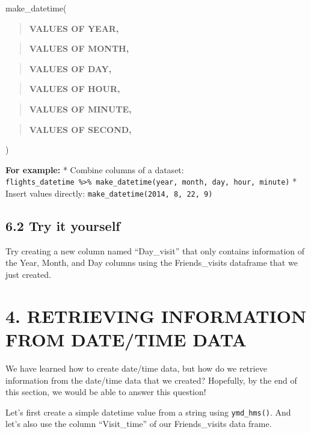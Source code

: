 \documentclass[
]{book}
\begin{document}
make\_datetime(

\begin{quote}
\textbf{VALUES OF YEAR,}
\end{quote}

\begin{quote}
\textbf{VALUES OF MONTH,}
\end{quote}

\begin{quote}
\textbf{VALUES OF DAY,}
\end{quote}

\begin{quote}
\textbf{VALUES OF HOUR,}
\end{quote}

\begin{quote}
\textbf{VALUES OF MINUTE,}
\end{quote}

\begin{quote}
\textbf{VALUES OF SECOND,}
\end{quote}

)

\textbf{For example:}
* Combine columns of a dataset: \texttt{flights\_datetime\ \%\textgreater{}\%\ make\_datetime(year,\ month,\ day,\ hour,\ minute)}
* Insert values directly: \texttt{make\_datetime(2014,\ 8,\ 22,\ 9)}

\hypertarget{try-it-yourself-29}{%
\subsection{6.2 Try it yourself}\label{try-it-yourself-29}}

Try creating a new column named ``Day\_visit'' that only contains information of the Year, Month, and Day columns using the Friends\_visits dataframe that we just created.

\hypertarget{retrieving-information-from-datetime-data}{%
\section{4. RETRIEVING INFORMATION FROM DATE/TIME DATA}\label{retrieving-information-from-datetime-data}}

We have learned how to create date/time data, but how do we retrieve information from the date/time data that we created? Hopefully, by the end of this section, we would be able to answer this question!

Let's first create a simple datetime value from a string using \texttt{ymd\_hms()}. And let's also use the column ``Visit\_time'' of our Friends\_visits data frame.
\end{document}
